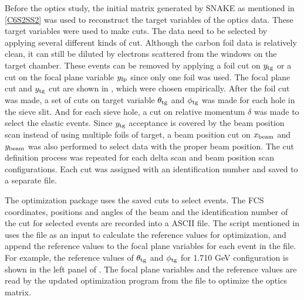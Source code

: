 Before the optics study, the initial matrix generated by SNAKE as mentioned in \cref{C6S2SS2} was used to reconstruct the target variables of the optics data. These target variables were used to make cuts. The data need to be selected by applying several different kinds of cut. Although the carbon foil data is relatively clean, it can still be diluted by electrons scattered from the windows on the target chamber. These events can be removed by applying a foil cut on $y_{\mathrm{tg}}$ or a cut on the focal plane variable $y_{\mathrm{fp}}$ since only one foil was used. The focal plane cut and $y_{\mathrm{tg}}$ cut are shown in , which were chosen empirically. After the foil cut was made, a set of cuts on target variable $\theta_{\mathrm{tg}}$ and $\phi_{\mathrm{tg}}$ was made for each hole in the sieve slit. And for each sieve hole, a cut on relative momentum $\delta$ was made to select the elastic events. Since $y_{\mathrm{tg}}$ acceptance is covered by the beam position scan instead of using multiple foils of target, a beam position cut on $x_{\mathrm{beam}}$ and $y_{\mathrm{beam}}$ was also performed to select data with the proper beam position. The cut definition process was repeated for each delta scan and beam position scan configurations. Each cut was assigned with an identification number and saved to a separate file.

The optimization package uses the saved cuts to select events. The FCS coordinates, positions and angles of the beam and the identification number of the cut for selected events are recorded into a ASCII file. The script mentioned in  uses the file as an input to calculate the reference values for optimization, and append the reference values to the focal plane variables for each event in the file. For example, the reference values of $\theta_{\mathrm{tg}}$ and $\phi_{\mathrm{tg}}$ for 1.710 GeV configuration is shown in the left panel of . The focal plane variables and the reference values are read by the updated optimization program from the file to optimize the optics matrix.

